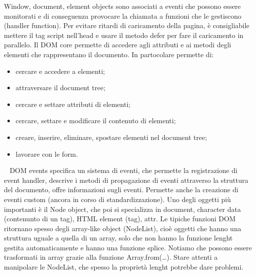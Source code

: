 \newline
Window, document, element objects sono associati a eventi che possono essere monitorati e di conseguenza provocare la chiamata a funzioni che le gestiscono (handler function).\newline
\newline
Per evitare ritardi di caricamento della pagina, è consigliabile mettere il tag script nell'head e usare il metodo defer per fare il caricamento in parallelo.
\newline
\newline
Il DOM core permette di accedere agli attributi e ai metodi degli elementi che rappresentano il documento.\newline
In partocolare permette di:
\begin{itemize}
    \item cercare e accedere a elementi;
    \item attraversare il document tree;
    \item cercare e settare attributi di elementi;
    \item cercare, settare e modificare il contenuto di elementi;
    \item creare, inserire, eliminare, spostare elementi nel document tree;
    \item lavorare con le form.
\end{itemize}
\ \newline
\newline
DOM events specifica un sistema di eventi, che permette la registrazione di event handler, descrive i metodi di propagazione di eventi attraverso la struttura del documento, offre informazioni sugli eventi. Permette anche la creazione di eventi custom (ancora in corso di standardizzazione).\newline
\newline
Uno degli oggetti più importanti è il Node object, che poi si specializza in document, character data (contenunto di un tag), HTML element (tag), attr.\newline
\newline
Le tipiche funzioni DOM ritornano spesso degli array-like object (NodeList), cioè oggetti che hanno una struttura uguale a quella di un array, solo che non hanno la funzione lenght gestita automaticamente e hanno una funzione splice. Notiamo che possono essere trasformati in array grazie alla funzione Array.from(\dots). Stare attenti a manipolare le NodeList, che spesso la proprietà lenght potrebbe dare problemi.\newline
